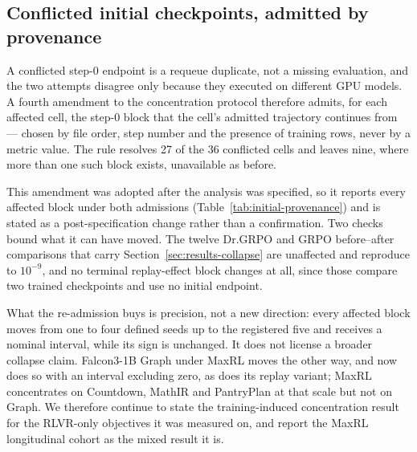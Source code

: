 \documentclass{article}
\newcommand{\1}{\mathbf 1}
\theoremstyle{remark}
\theoremstyle{definition}
\theoremstyle{plain}
\begin{document}
\subsection{Conflicted initial checkpoints, admitted by provenance}
\label{app:initial-provenance}

A conflicted step-0 endpoint is a requeue duplicate, not a missing evaluation,
and the two attempts disagree only because they executed on different GPU
models. A fourth amendment to the concentration protocol therefore admits, for
each affected cell, the step-0 block that the cell's admitted trajectory
continues from --- chosen by file order, step number and the presence of
training rows, never by a metric value. The rule resolves 27 of the 36
conflicted cells and leaves nine, where more than one such block exists,
unavailable as before.

This amendment was adopted after the analysis was specified, so it reports
every affected block under both admissions (Table~\ref{tab:initial-provenance}) and is stated as a
post-specification change rather than a confirmation. Two checks bound what it
can have moved. The twelve Dr.GRPO and GRPO before--after comparisons that
carry Section~\ref{sec:results-collapse} are unaffected and reproduce to
$10^{-9}$, and no terminal replay-effect block changes at all, since those
compare two trained checkpoints and use no initial endpoint.

What the re-admission buys is precision, not a new direction: every affected
block moves from one to four defined seeds up to the registered five and
receives a nominal interval, while its sign is unchanged. It does not license a
broader collapse claim. Falcon3-1B Graph under MaxRL moves the other way, and
now does so with an interval excluding zero, as does its replay variant; MaxRL
concentrates on Countdown, MathIR and PantryPlan at that scale but not on
Graph. We therefore continue to state the training-induced concentration result
for the RLVR-only objectives it was measured on, and report the MaxRL
longitudinal cohort as the mixed result it is.
\end{document}
